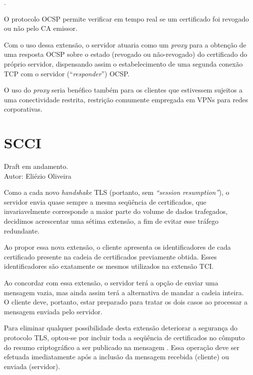 \begin{description}[\breaklabel]

\item[Referência]
	.

\item[Sinopse]
	O protocolo \ac{OCSP} \cite{rfc_ocsp} permite verificar em tempo real se um certificado foi 
	revogado ou não pelo \acs{CA} emissor.
	
\item[Propósito da Extensão]
	Com o uso dessa extensão, o servidor atuaria como um \emph{proxy} para a 
	obtenção de uma resposta \ac{OCSP} sobre o estado (revogado ou não-revogado) do 
	certificado do próprio servidor, dispensando assim o estabelecimento de uma segunda conexão TCP
	com o servidor (``\emph{responder}'') OCSP.
	
	O uso do \emph{proxy} seria benéfico também para os clientes que estivessem sujeitos a uma
	conectividade restrita, restrição comumente empregada em \acsp{VPN} para redes corporativas.

\end{description}


\section{\acf{SCCI}}

\begin{description}[\breaklabel]

\item[Referência]
	Draft em andamento. \\
	Autor: Eliézio Oliveira

\item[Sinopse]
	Como a cada novo \emph{handshake} TLS (portanto, sem \emph{``session resumption''}), o 
	servidor envia quase sempre a mesma seqüência de certificados, que 
	invariavelmente corresponde a maior parte do volume de dados trafegados, 
	decidimos acrescentar uma sétima extensão, a fim de evitar esse tráfego 
	redundante.

\item[Propósito da Extensão]
	Ao propor essa nova extensão, o cliente apresenta os identificadores de cada 
	certificado presente na cadeia de certificados previamente obtida. Esses 
	identificadores são exatamente os mesmos utilizados na extensão \acl{TCI}.

	Ao concordar com essa extensão, o servidor terá a opção de enviar uma 
	mensagem \tlsHsC vazia, mas ainda assim terá a alternativa de mandar a 
	cadeia inteira. O cliente deve, portanto, estar preparado para tratar os dois 
	casos ao processar a mensagem \tlsHsC enviada pelo servidor.

	Para eliminar qualquer possibilidade desta extensão deteriorar a segurança do 
	protocolo TLS, optou-se por incluir toda a seqüência de certificados no cômputo 
	do resumo criptográfico a ser publicado na mensagem \tlsHsF. Essa operação 
	deve ser efetuada imediatamente após a inclusão da mensagem \tlsHsC  
	recebida (cliente) ou enviada (servidor).

\end{description}

